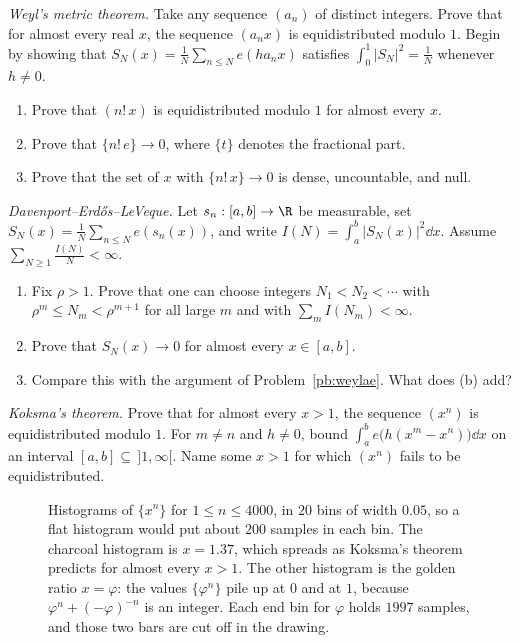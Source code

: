 \begin{exercise}[$\star\star$]\label{pb:weylae}
\emph{Weyl's metric theorem.} Take any sequence $(a_n)$ of distinct integers. Prove that for almost every real $x$, the sequence $(a_nx)$ is equidistributed modulo $1$. Begin by showing that $S_N(x)=\frac1N\sum_{n\le N}e(ha_nx)$ satisfies $\int_0^1|S_N|^2=\frac1N$ whenever $h\ne0$.
\end{exercise}

\begin{exercise}[$\star$]\label{pb:factorial}
\begin{enumerate}[label=(\alph*)]
\item Prove that $(n!\,x)$ is equidistributed modulo $1$ for almost every $x$.
\item Prove that $\{n!\,e\}\to0$, where $\{t\}$ denotes the fractional part.
\item Prove that the set of $x$ with $\{n!\,x\}\to0$ is dense, uncountable, and null.
\end{enumerate}
\end{exercise}

\begin{exercise}[$\star\star\star$]\label{pb:del}
\emph{Davenport--Erdős--LeVeque.} Let $s_n:[a,b]\to\R$ be measurable, set $S_N(x)=\frac1N\sum_{n\le N}e(s_n(x))$, and write $I(N)=\int_a^b|S_N(x)|^2\dd x$. Assume $\sum_{N\ge1}\frac{I(N)}N<\infty$.
\begin{enumerate}[label=(\alph*)]
\item Fix $\rho>1$. Prove that one can choose integers $N_1<N_2<\cdots$ with $\rho^m\le N_m<\rho^{m+1}$ for all large $m$ and with $\sum_mI(N_m)<\infty$.
\item Prove that $S_N(x)\to0$ for almost every $x\in[a,b]$.
\item Compare this with the argument of Problem~\ref{pb:weylae}. What does (b) add?
\end{enumerate}
\end{exercise}

\begin{exercise}[$\star\star\star$]\label{pb:koksma}
\emph{Koksma's theorem.} Prove that for almost every $x>1$, the sequence $(x^n)$ is equidistributed modulo $1$. For $m\ne n$ and $h\ne0$, bound $\int_a^be\bigl(h(x^m-x^n)\bigr)\dd x$ on an interval $[a,b]\subseteq\,]1,\infty[$. Name some $x>1$ for which $(x^n)$ fails to be equidistributed.
\end{exercise}

\begin{figure}[ht]
\centering
{}
\caption{Histograms of $\{x^n\}$ for $1\le n\le 4000$, in $20$ bins of width $0.05$, so a flat histogram would put about $200$ samples in each bin. The charcoal histogram is $x=1.37$, which spreads as Koksma's theorem predicts for almost every $x>1$. The other histogram is the golden ratio $x=\varphi$: the values $\{\varphi^n\}$ pile up at $0$ and at $1$, because $\varphi^n+(-\varphi)^{-n}$ is an integer. Each end bin for $\varphi$ holds $1997$ samples, and those two bars are cut off in the drawing.}\label{fig:koksma}
\end{figure}

